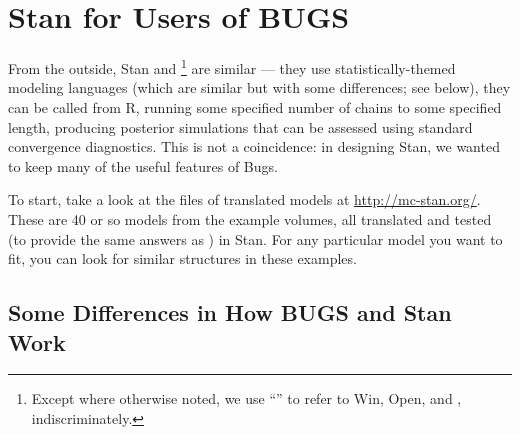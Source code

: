 \chapter{Stan for Users of BUGS}\label{stan-for-bugs.appendix}

From the outside, Stan and \BUGS%
%
\footnote{Except where otherwise noted, we use ``\BUGS'' to refer to
  Win\BUGS, Open\BUGS, and \JAGS, indiscriminately.}
%
are similar --- they use statistically-themed modeling languages
(which are similar but with some differences; see below), they can be
called from R, running some specified number of chains to some
specified length, producing posterior simulations that can be assessed
using standard convergence diagnostics.  This is not a coincidence:
in designing Stan, we wanted to keep many of the useful features of
Bugs.

To start, take a look at the files of translated \BUGS models at
\url{http://mc-stan.org/}.  These are 40 or so models from the \BUGS
example volumes, all translated and tested (to provide the same
answers as \BUGS) in Stan.  For any particular model you want to fit,
you can look for similar structures in these examples.

\section{Some Differences in How BUGS and Stan Work}

